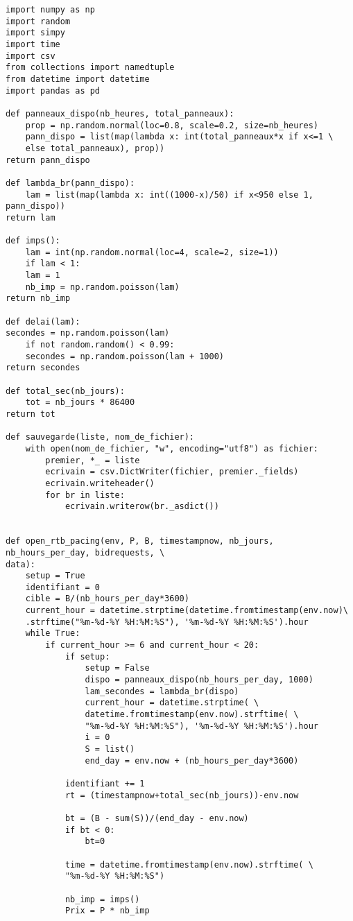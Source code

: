 \documentclass[12pt]{article}
\begin{document}
\newpage

\begin{lstlisting}[style=Python]
import numpy as np
import random 
import simpy
import time
import csv
from collections import namedtuple
from datetime import datetime
import pandas as pd

def panneaux_dispo(nb_heures, total_panneaux):
	prop = np.random.normal(loc=0.8, scale=0.2, size=nb_heures)
	pann_dispo = list(map(lambda x: int(total_panneaux*x if x<=1 \
	else total_panneaux), prop))
return pann_dispo

def lambda_br(pann_dispo):
	lam = list(map(lambda x: int((1000-x)/50) if x<950 else 1, pann_dispo))
return lam

def imps():
	lam = int(np.random.normal(loc=4, scale=2, size=1))
	if lam < 1:
	lam = 1
	nb_imp = np.random.poisson(lam)
return nb_imp

def delai(lam):
secondes = np.random.poisson(lam)
	if not random.random() < 0.99:
	secondes = np.random.poisson(lam + 1000)
return secondes

def total_sec(nb_jours):
	tot = nb_jours * 86400
return tot

def sauvegarde(liste, nom_de_fichier):
	with open(nom_de_fichier, "w", encoding="utf8") as fichier:
		premier, *_ = liste
		ecrivain = csv.DictWriter(fichier, premier._fields)
		ecrivain.writeheader()
		for br in liste:
			ecrivain.writerow(br._asdict())
		
			
def open_rtb_pacing(env, P, B, timestampnow, nb_jours, nb_hours_per_day, bidrequests, \
data):
	setup = True
	identifiant = 0
	cible = B/(nb_hours_per_day*3600)
	current_hour = datetime.strptime(datetime.fromtimestamp(env.now)\
	.strftime("%m-%d-%Y %H:%M:%S"), '%m-%d-%Y %H:%M:%S').hour
	while True:
		if current_hour >= 6 and current_hour < 20:
			if setup:
				setup = False
				dispo = panneaux_dispo(nb_hours_per_day, 1000)
				lam_secondes = lambda_br(dispo)
				current_hour = datetime.strptime( \
				datetime.fromtimestamp(env.now).strftime( \
				"%m-%d-%Y %H:%M:%S"), '%m-%d-%Y %H:%M:%S').hour
				i = 0
				S = list()
				end_day = env.now + (nb_hours_per_day*3600)
			
			identifiant += 1
			rt = (timestampnow+total_sec(nb_jours))-env.now
			
			bt = (B - sum(S))/(end_day - env.now) 
			if bt < 0:
				bt=0
			
			time = datetime.fromtimestamp(env.now).strftime( \
			"%m-%d-%Y %H:%M:%S")
			
			nb_imp = imps()
			Prix = P * nb_imp
			

\end{lstlisting}
\end{document}
